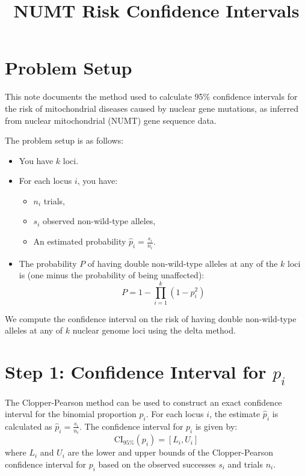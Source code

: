 \documentclass{article}
\title{NUMT Risk Confidence Intervals}
\date{}
\begin{document}
\maketitle

\section*{Problem Setup}
This note documents the method used to calculate 95\% confidence intervals for the risk of mitochondrial diseases caused by nuclear gene mutations, as inferred from nuclear mitochondrial (NUMT) gene sequence data.

The problem setup is as follows:
\begin{itemize}
    \item You have \( k \) loci.
    \item For each locus \( i \), you have:
    \begin{itemize}
        \item \( n_i \) trials,
        \item \( s_i \) observed non-wild-type alleles,
        \item An estimated probability \( \hat{p}_i = \frac{s_i}{n_i} \).
    \end{itemize}
    \item The probability \( P \) of having double non-wild-type alleles at any of the \( k \) loci is (one minus the probability of being unaffected):
    \[
    P = 1 - \prod_{i=1}^{k} (1 - p_i^2)
    \]
\end{itemize}

We compute the confidence interval on the risk of having double non-wild-type alleles at any of $k$ nuclear genome loci using the delta method.

\section*{Step 1: Confidence Interval for \( p_i \)}

The Clopper-Pearson method can be used to construct an exact confidence interval for the binomial proportion \( p_i \). For each locus \( i \), the estimate \( \hat{p}_i \) is calculated as \( \hat{p}_i = \frac{s_i}{n_i} \). The confidence interval for \( p_i \) is given by:
\[
\text{CI}_{95\%}(p_i) = \left[ L_i, U_i \right]
\]
where \( L_i \) and \( U_i \) are the lower and upper bounds of the Clopper-Pearson confidence interval for \( p_i \) based on the observed successes \( s_i \) and trials \( n_i \).
\end{document}
